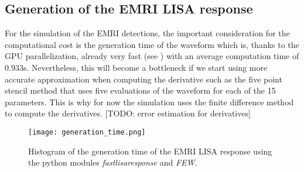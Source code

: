 \subsection{Generation of the EMRI LISA response}\label{subsec:generation-of-the-emri-lisa-response}
For the simulation of the EMRI detections, the important consideration for the computational cost is the generation time of the waveform which is, thanks to the GPU parallelization, already very fast (see ) with an average computation time of $0.933$s. Nevertheless, this will become a bottleneck if we start using more accurate approximation when computing the derivative such as the five point stencil method that uses five evaluations of the waveform for each of the 15 parameters. This is why for now the simulation uses the finite difference method  to compute the derivatives. [TODO: error estimation for derivatives]
\begin{figure}
    \centering
    \texttt{[image: generation\_time.png]}
    \caption[Waveform generation time histogram]{Histogram of the generation time of the EMRI LISA response using the python modules \emph{fastlisaresponse} and \emph{FEW}.}
    \label{fig:waveform-generation-time}
\end{figure}

